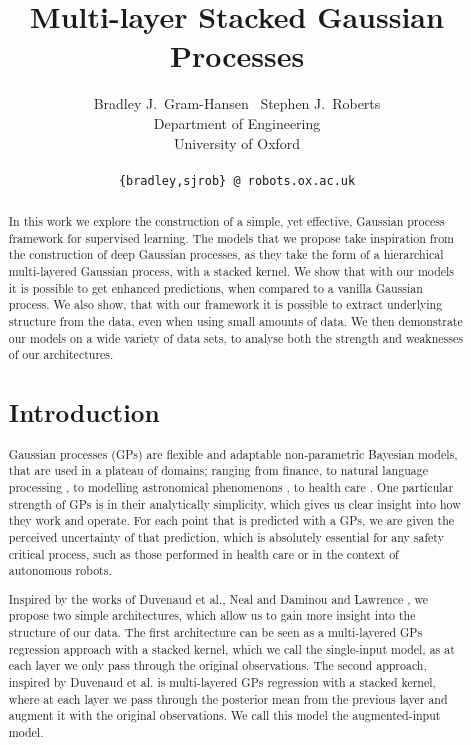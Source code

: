\documentclass{article}
\title{Multi-layer Stacked Gaussian Processes}
\author{
	Bradley J.~Gram-Hansen ~Stephen J.~Roberts%
 \\
	Department of Engineering\\
	University of Oxford\\
	 \\
	\texttt{\{bradley,sjrob\}~@~robots.ox.ac.uk} \\
}
\begin{document}
	
	\maketitle	
	\begin{abstract}
		In this work we explore the construction of a simple, yet effective, Gaussian process framework for supervised learning. The models that we propose take inspiration from the construction of deep Gaussian processes, as they take the form of a hierarchical multi-layered Gaussian process, with a stacked kernel. We show that with our models it is possible to get enhanced predictions, when compared to a vanilla Gaussian process. We also show, that with our framework it is possible to extract underlying structure from the data, even when using small amounts of data. We then demonstrate our models on a wide variety of data sets, to analyse both the strength and weaknesses of our architectures.
	
	\section{Introduction}
	

    Gaussian processes (GPs) are flexible and adaptable non-parametric Bayesian models, that are used in a plateau of domains; ranging from finance\cite{ghoshal2016extracting}, to natural language processing \cite{bratieres2013}, to modelling astronomical phenomenons \cite{rajpaul2015}, to health care  \cite{clifton2013gaussian}. One particular strength of GPs is in their analytically simplicity, which gives us clear insight into how they work and operate. For each point that is predicted with a GPs, we are given the perceived uncertainty of that prediction, which is absolutely essential for any safety critical process, such as those performed in health care \cite{clifton2013gaussian} or in the context of autonomous robots. \cite{aoude2013probabilistically} 
    
    
    Inspired by the works of Duvenaud et al.\cite{duvenaud2014}, Neal \cite{neal1995} and Daminou and Lawrence \cite{damianou2013deep}, we propose two simple architectures, which allow us to gain more insight into the structure of our data. The first architecture can be seen as a multi-layered GPs regression approach with a stacked kernel, which we call the single-input model, as at each layer we only pass through the original observations. The second approach, inspired by Duvenaud et al. \cite{duvenaud2014} is multi-layered GPs regression with a stacked kernel,  where at each layer we pass through the posterior mean from the previous layer and augment it with the original observations. We call this model the augmented-input model.
    

\end{abstract}
\end{document}
